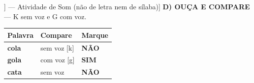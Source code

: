 \begin{exercicio}[Som /k/ [[k]] --- Atividade de Som (não de letra nem de sílaba)]
\textbf{D) OUÇA E COMPARE} --- K sem voz e G com voz.

\begin{center}
\begin{tabular}{@{}p{4.2cm}p{6.2cm}p{1.6cm}@{}}
\hline
\textbf{Palavra} & \textbf{Compare} & \textbf{Marque} \\
\hline
\textbf{cola} & sem voz [k] & \textbf{NÃO} \\
\textbf{gola} & com voz [g] & \textbf{SIM} \\
\textbf{cata} & sem voz & \textbf{NÃO} \\
\hline
\end{tabular}
\end{center}

\end{exercicio}

